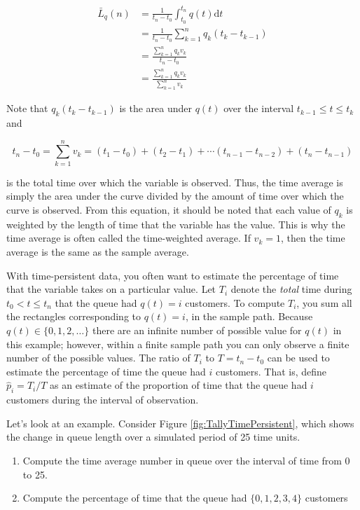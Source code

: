 \documentclass[
]{book}
\theoremstyle{definition}
\theoremstyle{definition}
\theoremstyle{definition}
\theoremstyle{definition}
\theoremstyle{remark}
\begin{document}
\[
\begin{aligned}
\bar{L}_q(n) &= \frac{1}{t_n - t_0} \int_{t_0}^{t_n} q(t) \mathrm{d}t\\
 & = \frac{1}{t_n - t_0} \sum_{k=1}^{n} q_k (t_k - t_{k-1})\\
 & = \frac{\sum_{k=1}^{n} q_k v_k}{t_n - t_0} \\
 & = \frac{\sum_{k=1}^{n} q_k v_k}{\sum_{k=1}^{n} v_k}
\end{aligned}
\]

Note that \(q_k (t_k - t_{k-1})\) is the area under \(q(t)\) over the
interval \(t_{k-1} \leq t \leq t_k\) and

\[t_n - t_0 = \sum_{k=1}^{n} v_k = (t_1 - t_0) + (t_2 - t_1) + \cdots (t_{n-1} - t_{n-2}) + (t_n - t_{n-1})\]

is the total time over which the variable is observed. Thus, the time
average is simply the area under the curve divided by the amount of time
over which the curve is observed. From this equation, it should be noted
that each value of \(q_k\) is weighted by the length of time that the
variable has the value. This is why the time average is often called the
time-weighted average. If \(v_k = 1\), then the time average is the same
as the sample average.

With time-persistent data, you often want to estimate the percentage of
time that the variable takes on a particular value. Let \(T_i\) denote the
\emph{total} time during \(t_0 < t \leq t_n\) that the queue had \(q(t) = i\)
customers. To compute \(T_i\), you sum all the rectangles corresponding to
\(q(t) = i\), in the sample path. Because
\(q(t) \in \lbrace 0,1,2,\ldots\rbrace\) there are an infinite number of
possible value for \(q(t)\) in this example; however, within a finite
sample path you can only observe a finite number of the possible values.
The ratio of \(T_i\) to \(T = t_n - t_0\) can be used to estimate the
percentage of time the queue had \(i\) customers. That is, define
\(\hat{p}_i = T_i/T\) as an estimate of the proportion of time that the
queue had \(i\) customers during the interval of observation.

Let's look at an example. Consider Figure \ref{fig:TallyTimePersistent}, which shows the change in queue
length over a simulated period of 25 time units.

\begin{enumerate}
\def\labelenumi{\arabic{enumi}.}
\item
  Compute the time average number in queue over the interval of time
  from 0 to 25.
\item
  Compute the percentage of time that the queue had
  \(\lbrace 0, 1, 2, 3, 4\rbrace\) customers
\end{enumerate}
\end{document}
